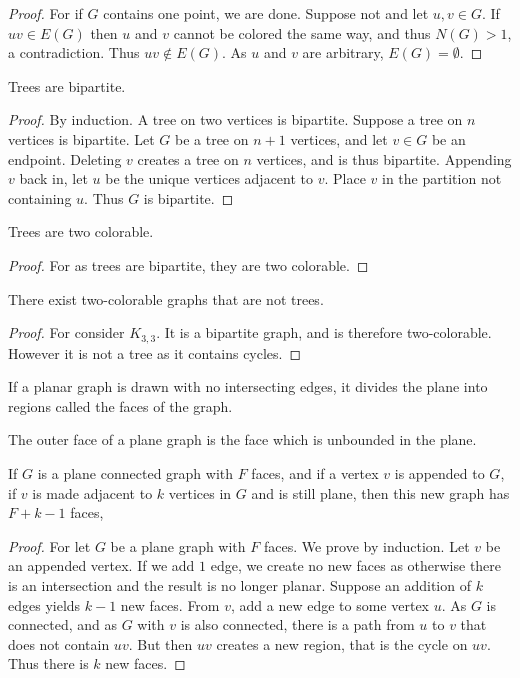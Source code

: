 \documentclass[crop=false,class=book,oneside]{standalone}
\begin{document}
\begin{proof}
For if $G$ contains one point, we are done. Suppose not and let $u,v\in G$. If $uv \in E(G)$ then $u$ and $v$ cannot be colored the same way, and thus $N(G)>1$, a contradiction. Thus $uv\notin E(G)$. As $u$ and $v$ are arbitrary, $E(G) = \emptyset$.
\end{proof}
\begin{lemma}
Trees are bipartite.
\end{lemma}
\begin{proof}
By induction. A tree on two vertices is bipartite. Suppose a tree on $n$ vertices is bipartite. Let $G$ be a tree on $n+1$ vertices, and let $v\in G$ be an endpoint. Deleting $v$ creates a tree on $n$ vertices, and is thus bipartite. Appending $v$ back in, let $u$ be the unique vertices adjacent to $v$. Place $v$ in the partition not containing $u$. Thus $G$ is bipartite.
\end{proof}
\begin{corollary}
Trees are two colorable.
\end{corollary}
\begin{proof}
For as trees are bipartite, they are two colorable.
\end{proof}
\begin{corollary}
There exist two-colorable graphs that are not trees.
\end{corollary}
\begin{proof}
For consider $K_{3,3}$. It is a bipartite graph, and is therefore two-colorable. However it is not a tree as it contains cycles.
\end{proof}
\begin{definition}
If a planar graph is drawn with no intersecting edges, it divides the plane into regions called the faces of the graph.
\end{definition}
\begin{definition}
The outer face of a plane graph is the face which is unbounded in the plane.
\end{definition}
\begin{lemma}
If $G$ is a plane connected graph with $F$ faces, and if a vertex $v$ is appended to $G$, if $v$ is made adjacent to $k$ vertices in $G$ and is still plane, then this new graph has $F+k-1$ faces,
\end{lemma}
\begin{proof}
For let $G$ be a plane graph with $F$ faces. We prove by induction. Let $v$ be an appended vertex. If we add $1$ edge, we create no new faces as otherwise there is an intersection and the result is no longer planar. Suppose an addition of $k$ edges yields $k-1$ new faces. From $v$, add a new edge to some vertex $u$. As $G$ is connected, and as $G$ with $v$ is also connected, there is a path from $u$ to $v$ that does not contain $uv$. But then $uv$ creates a new region, that is the cycle on $uv$. Thus there is $k$ new faces.
\end{proof}
\end{document}
